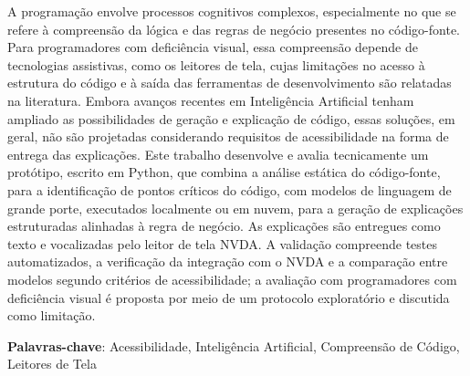 \documentclass[
    12pt,                   %
    openright,              %
    oneside,                %
    a4paper,                %
    sumario=tradicional,    %
    english,                %
    brazil,                 %
    ]{abntex2}
\begin{document}
\begin{resumo}
 \noindent
 A programação envolve processos cognitivos complexos, especialmente no que se refere à compreensão da lógica e das regras de negócio presentes no código-fonte. Para programadores com deficiência visual, essa compreensão depende de tecnologias assistivas, como os leitores de tela, cujas limitações no acesso à estrutura do código e à saída das ferramentas de desenvolvimento são relatadas na literatura. Embora avanços recentes em Inteligência Artificial tenham ampliado as possibilidades de geração e explicação de código, essas soluções, em geral, não são projetadas considerando requisitos de acessibilidade na forma de entrega das explicações. Este trabalho desenvolve e avalia tecnicamente um protótipo, escrito em Python, que combina a análise estática do código-fonte, para a identificação de pontos críticos do código, com modelos de linguagem de grande porte, executados localmente ou em nuvem, para a geração de explicações estruturadas alinhadas à regra de negócio. As explicações são entregues como texto e vocalizadas pelo leitor de tela NVDA. A validação compreende testes automatizados, a verificação da integração com o NVDA e a comparação entre modelos segundo critérios de acessibilidade; a avaliação com programadores com deficiência visual é proposta por meio de um protocolo exploratório e discutida como limitação.
 \vspace{\onelineskip}

 \noindent
 \textbf{Palavras-chave}: Acessibilidade, Inteligência Artificial, Compreensão de Código, Leitores de Tela
\end{resumo}
\end{document}
